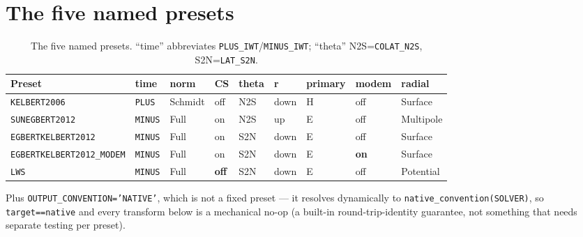 \documentclass[11pt]{article}
\begin{document}
\section{The five named presets}
\label{sec:presets}

\begin{table}[h]
\centering
\small
\begin{tabular}{lllllllll}
\toprule
Preset & time & norm & CS & theta & r & primary & modem & radial \\
\midrule
\texttt{KELBERT2006}      & \texttt{PLUS}  & Schmidt & off & N2S & down & H & off & Surface \\
\texttt{SUNEGBERT2012}    & \texttt{MINUS} & Full    & on  & N2S & up   & E & off & Multipole \\
\texttt{EGBERTKELBERT2012}& \texttt{MINUS} & Full    & on  & S2N & down & E & off & Surface \\
\texttt{EGBERTKELBERT2012\_MODEM} & \texttt{MINUS} & Full & on & S2N & down & E & \textbf{on} & Surface \\
\texttt{LWS}               & \texttt{MINUS} & Full    & \textbf{off} & S2N & down & E & off & Potential \\
\bottomrule
\end{tabular}
\caption{The five named presets. ``time'' abbreviates \texttt{PLUS\_IWT}/\texttt{MINUS\_IWT};
``theta'' N2S=\texttt{COLAT\_N2S}, S2N=\texttt{LAT\_S2N}.}
\end{table}

Plus \texttt{OUTPUT\_CONVENTION='NATIVE'}, which is not a fixed preset --- it resolves dynamically
to \texttt{native\_convention(SOLVER)}, so \texttt{target==native} and every transform below is a
mechanical no-op (a built-in round-trip-identity guarantee, not something that needs separate
testing per preset).
\end{document}
